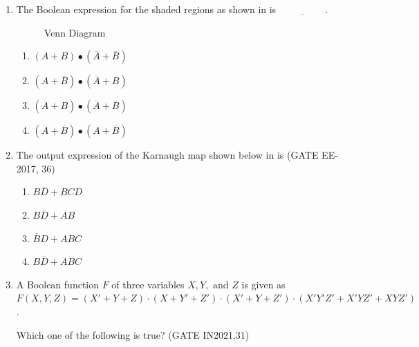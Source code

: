 \begin{enumerate}[label=\arabic*.,ref=\theenumi]
\item The Boolean expression for the shaded 
regions as shown in 
is $\underline{\hspace{2cm}}$.
\hfill{}

\begin{figure}[!ht]
	\centering
	\resizebox{\columnwidth}{!}{%

	}
\caption{Venn Diagram}
\label{fig:figure12}
\end{figure}


\begin{enumerate}
\item $(A + B)\bullet(\overline{A} + \overline{B})$
\item $(A + \overline{B})\bullet(\overline{A} + B)$
\item $(\overline{A} +  B)\bullet
(\overline{A} + \overline{B})$
\item $(\overline{A} + \overline{B})\bullet
(A + \overline{B})$
\end{enumerate}

\item The output expression of the Karnaugh map shown below in
is
				\hfill(GATE EE-2017, 36)

\begin{figure}[!ht]
\centering

	\caption{}
\label{fig:k-map-E}
\end{figure}

\begin{enumerate}[label=\Alph*.]
\item $B\overline{D} + BCD$
\item $B\overline{D} + AB$
\item $\overline{B}D + ABC$
\item $B\overline{D} + ABC$
\end{enumerate}

\item A Boolean function $F$ of three variables $X, Y, \text{ and } Z$ is given as 
$F(X, Y, Z) = (X' + Y + Z)\cdot(X + Y' + Z') \cdot (X' + Y + Z') \cdot (X'Y'Z' + X' Y Z' + XYZ')$.

Which one of the following is true?
\hfill(GATE IN2021,31)


\end{enumerate}
